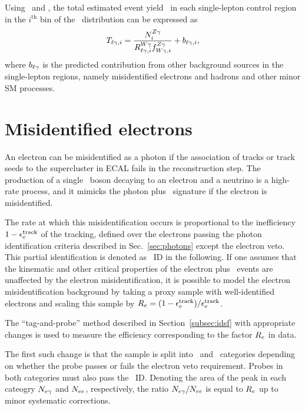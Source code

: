 Using \RWl\ and \fZW, the total estimated event yield \Tl\ in each single-lepton control region in the $i^\mathrm{th}$ bin of the \ETg\ distribution can be expressed as
\begin{equation}
  \Tl[,i] = \frac{\NZg[i]}{\RWl[,i]\fZW[,i]} + b_{\ell\Pgg,i},
\end{equation}
where $b_{\ell\Pgg}$ is the predicted contribution from other background sources in the single-lepton regions, namely misidentified electrons and hadrons and other minor SM processes.

\section{Misidentified electrons}
\label{sec:efake}

An electron can be misidentified as a photon if the association of tracks or track seeds to the supercluster in ECAL fails in the reconstruction step. 
The production of a single \PW\ boson decaying to an electron and a neutrino is a high-rate process, and it mimicks the photon plus \met\ signature if the electron is misidentified.

The rate at which this misidentification occurs is proportional to the inefficiency $1 - \epsilon_{\Pe}^{\text{track}}$ of the tracking, defined over the electrons passing the photon identification criteria described in Sec.~\ref{sec:photons} except the electron veto. 
This partial identification is denoted as \Pe\Pgg\ ID in the following.  
If one assumes that the kinematic and other critical properties of the electron plus \met\ events are unaffected by the electron misidentification, it is possible to model the electron misidentification background by taking a proxy sample with well-identified electrons and scaling this sample by $R_{\Pe} = (1 - \epsilon_{\Pe}^{\text{track}}) / \epsilon_{\Pe}^{\text{track}}$.

The ``tag-and-probe'' method described in Section~\ref{subsec:idsf} with appropriate changes is used to measure the efficiency corresponding to the factor $R_{\Pe}$ in data.

The first such change is that the sample is split into \Pe\Pgg\ and \Pe\Pe\ categories depending on whether the probe passes or fails the electron veto requirement. 
Probes in both categories must also pass the \Pe\Pgg\ ID.
Denoting the area of the peak in each cateogry  $N_{\Pe\Pgg}$ and $N_{\Pe\Pe}$, respectively, the ratio $N_{\Pe\Pgg} / N_{\Pe\Pe}$ is equal to $R_{\Pe}$ up to minor systematic corrections.

